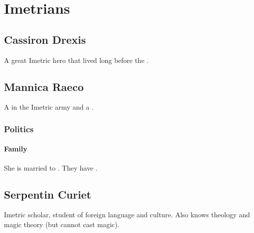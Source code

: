 \chapter{Imetrians}















\section{Cassiron Drexis}
A great Imetric hero that lived long before the \thirdbanewar. 















\section{Mannica Raeco}
A \Retaxis{} in the Imetric army and a \nycaneer. 









\subsection{Politics}
\subsubsection{Family}
She is married to . 
They have .















\section{Serpentin Curiet}
Imetric scholar, student of foreign language and culture. Also knows theology and magic theory (but cannot cast magic). 

